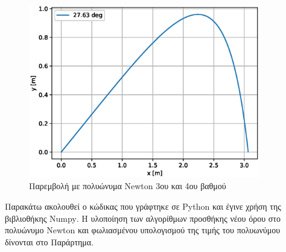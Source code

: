 \documentclass[assignment4.tex]{subfiles}
\begin{document}
\begin{figure}[hp]
	\includegraphics[width=0.9\textwidth]{ex3b.eps}
	\centering
	\caption{Παρεμβολή με πολυώνυμα \textlatin{Newton} 3ου και 4ου βαθμού}
	\label{fig:ex3}
\end{figure}
Παρακάτω ακολουθεί ο κώδικας που γράφτηκε σε \textlatin{Python} και έγινε χρήση της βιβλιοθήκης \textlatin{Numpy}. Η υλοποίηση των αλγορίθμων προσθήκης νέου όρου στο πολυώνυμο \textlatin{Newton} και φωλιασμένου υπολογισμού της τιμής του πολυωνύμου δίνονται στο Παράρτημα.

\end{document}
